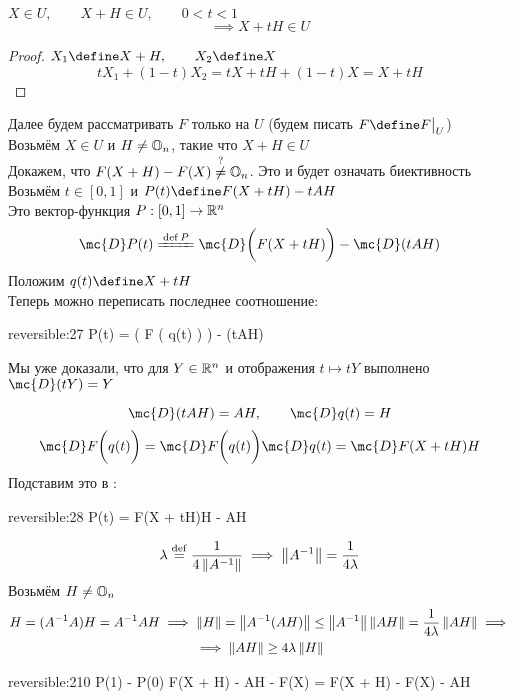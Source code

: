 \begin{implication}
	$ X \in U, \qquad X + H \in U, \qquad 0 < t < 1 $
	$$ \implies X + tH \in U $$
\end{implication}

\begin{proof}
	$ X_1 \define X + H, \qquad X_2 \define X $
	$$ tX_1 + (1 - t)X_2 = tX + tH + (1 - t)X = X + tH $$
\end{proof}

\begin{replacementproof}[Биективность $ F $]
	Далее будем рассматривать $ F $ только на $ U $ (\ie будем писать $ F \define F\clamp{U} $) \\
	Возьмём $ X \in U $ и $ H \ne \mathbb{O}_{n} $, такие что $ X + H \in U $ \\
	Докажем, что $ F(X + H) - F(X) \stackrel?\ne \mathbb{O}_{n} $. Это и будет означать биективность \\
	Возьмём $ t \in [0, 1] $ и $ P(t) \define F(X + tH) - tAH $ \\
	Это вектор-функция $ P : [0, 1] \to \mathbb{R}^n $
	$$ \mc{D}P(t) \bdefeq{P} \mc{D} \bigg( F(X + tH) \bigg) - \mc{D}(tAH) $$
	Положим $ q(t) \define X + tH $ \\
	Теперь можно переписать последнее соотношение:
	\begin{equ}{reversible:27}
		P(t) =  \bigg( F \big( q(t) \big) \bigg) - (tAH)
	\end{equ}
	\begin{remind}
		Мы уже доказали, что для $ Y \in \mathbb{R}^n $ и отображения $ t \mapsto tY $ выполнено $ \mc{D}(tY) = Y $
	\end{remind}
	$$ \mc{D}(tAH) = AH, \qquad \mc{D}q(t) = H $$
	$$ \mc{D}F \bigg( q(t) \bigg) = \mc{D}F \bigg( q(t) \bigg)\mc{D}q(t) = \mc{D}F(X + tH)H $$
	Подставим это в :
	\begin{equ}{reversible:28}
		P(t) = F(X + tH)H - AH
	\end{equ}
	$$ \lambda \stackrel{\operatorname{def}}{=} \frac1{4\left\|{A^{-1}}\right\|} \implies \left\|{A^{-1}}\right\| = \frac1{4\lambda} $$
	Возьмём $ H \ne \mathbb{O}_{n} $
	\begin{multline}\lbl{reversible:29}
		H = (A^{-1}A)H = A^{-1}AH \implies \norm{H} = \norm{A^{-1}(AH)} \le \norm{A^{-1}}\norm{AH} = \frac1{4\lambda}\norm{AH} \implies \\
		\implies \norm{AH} \ge 4\lambda\norm{H}
	\end{multline}
	\begin{equ}{reversible:210}
		P(1) - P(0)  F(X + H) - AH - F(X) = F(X + H) - F(X) - AH

\end{equ}
\end{replacementproof}
